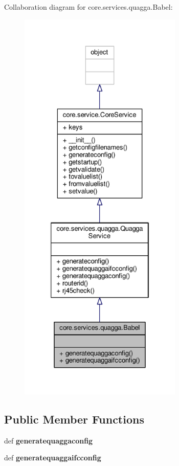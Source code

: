 Collaboration diagram for core.\+services.\+quagga.\+Babel\+:
\nopagebreak
\begin{figure}[H]
\begin{center}
\leavevmode
\includegraphics[height=550pt]{classcore_1_1services_1_1quagga_1_1_babel__coll__graph}
\end{center}
\end{figure}
\subsection*{Public Member Functions}
\begin{DoxyCompactItemize}
\item 
\hypertarget{classcore_1_1services_1_1quagga_1_1_babel_a4dfa901119b9efa705d7ffce367b3d53}{def {\bfseries generatequaggaconfig}}\label{classcore_1_1services_1_1quagga_1_1_babel_a4dfa901119b9efa705d7ffce367b3d53}

\item 
\hypertarget{classcore_1_1services_1_1quagga_1_1_babel_a5bc58a1afc3a64d1f674f4e926cd9a56}{def {\bfseries generatequaggaifcconfig}}\label{classcore_1_1services_1_1quagga_1_1_babel_a5bc58a1afc3a64d1f674f4e926cd9a56}

\end{DoxyCompactItemize}
